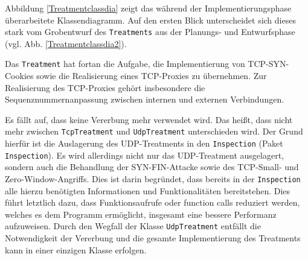 \documentclass[../review_3.tex]{subfiles}
\begin{document}
Abbildung \ref{Treatmentclassdia} zeigt das während der Implementierungsphase überarbeitete Klassendiagramm. Auf den ersten Blick unterscheidet sich dieses stark vom Grobentwurf des \texttt{Treatments} aus der Planungs- und Entwurfsphase (vgl. Abb. \ref{Treatmentclassdia2}).

Das \texttt{Treatment} hat fortan die Aufgabe, die Implementierung von TCP-SYN-Cookies sowie die Realisierung eines TCP-Proxies zu übernehmen. Zur Realisierung des TCP-Proxies gehört insbesondere die Sequenznummernanpassung zwischen internen und externen Verbindungen.

Es fällt auf, dass keine Vererbung mehr verwendet wird. Das heißt, dass nicht mehr zwischen \texttt{TcpTreatment} und \texttt{UdpTreatment} unterschieden wird. Der Grund hierfür ist die Auslagerung des UDP-Treatments in den \texttt{Inspection} (Paket \texttt{Inspection}). Es wird allerdings nicht nur das UDP-Treatment ausgelagert, sondern auch die Behandlung der SYN-FIN-Attacke sowie des TCP-Small- und Zero-Window-Angriffs. Dies ist darin begründet, dass bereits in der \texttt{Inspection} alle hierzu benötigten Informationen und Funktionalitäten bereitstehen. Dies führt letztlich dazu, dass Funktionsaufrufe oder function calls reduziert werden, welches es dem Programm ermöglicht, insgesamt eine bessere Performanz aufzuweisen.
Durch den Wegfall der Klasse \texttt{UdpTreatment} entfällt die Notwendigkeit der Vererbung und die gesamte Implementierung des Treatments kann in einer einzigen Klasse erfolgen.
\end{document}
